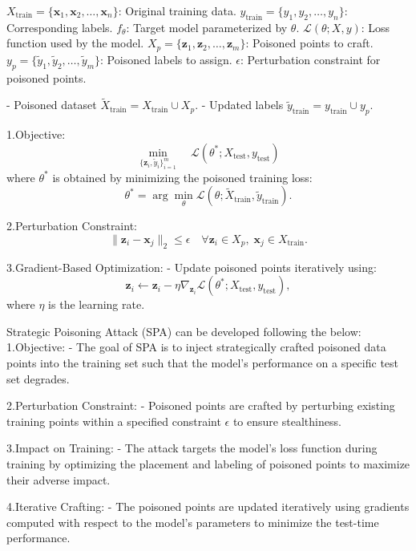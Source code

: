 
$X_{\text{train}} = \{\mathbf{x}_1, \mathbf{x}_2, \ldots, \mathbf{x}_n\}$: Original training data.
$y_{\text{train}} = \{y_1, y_2, \ldots, y_n\}$: Corresponding labels.
$f_\theta$: Target model parameterized by $\theta$.
$\mathcal{L}(\theta; X, y)$: Loss function used by the model.
$X_p = \{\mathbf{z}_1, \mathbf{z}_2, \ldots, \mathbf{z}_m\}$: Poisoned points to craft.
$y_p = \{\tilde{y}_1, \tilde{y}_2, \ldots, \tilde{y}_m\}$: Poisoned labels to assign.
$\epsilon$: Perturbation constraint for poisoned points.

- Poisoned dataset $\tilde{X}_{\text{train}} = X_{\text{train}} \cup X_p$.
- Updated labels $\tilde{y}_{\text{train}} = y_{\text{train}} \cup y_p$.

1.Objective:
   \[
   \min_{\{\mathbf{z}_i, \tilde{y}_i\}_{i=1}^m} \quad \mathcal{L}(\theta^*; X_{\text{test}}, y_{\text{test}})
   \]
   where $\theta^*$ is obtained by minimizing the poisoned training loss:
   \[
   \theta^* = \arg \min_\theta \mathcal{L}(\theta; \tilde{X}_{\text{train}}, \tilde{y}_{\text{train}}).
   \]

2.Perturbation Constraint:
   \[
   \|\mathbf{z}_i - \mathbf{x}_j\|_2 \leq \epsilon \quad \forall \mathbf{z}_i \in X_p, \; \mathbf{x}_j \in X_{\text{train}}.
   \]

3.Gradient-Based Optimization:
   - Update poisoned points iteratively using:
     \[
     \mathbf{z}_i \leftarrow \mathbf{z}_i - \eta \nabla_{\mathbf{z}_i} \mathcal{L}(\theta^*; X_{\text{test}}, y_{\text{test}}),
     \]
     where $\eta$ is the learning rate.

Strategic Poisoning Attack (SPA) can be developed following the below:
1.Objective:
   - The goal of SPA is to inject strategically crafted poisoned data points into the training set such that the model's performance on a specific test set degrades.

2.Perturbation Constraint:
   - Poisoned points are crafted by perturbing existing training points within a specified constraint $\epsilon$ to ensure stealthiness.

3.Impact on Training:
   - The attack targets the model's loss function during training by optimizing the placement and labeling of poisoned points to maximize their adverse impact.

4.Iterative Crafting:
   - The poisoned points are updated iteratively using gradients computed with respect to the model's parameters to minimize the test-time performance.

